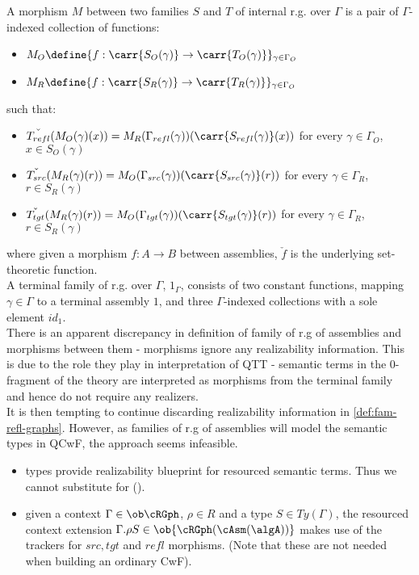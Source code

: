 \documentclass[12pt,a4paper]{article}
\def\src{_{src}}\alwaysmath{src}
\def\rfl{_{refl}}\alwaysmath{rfl}
\def\tgt{_{tgt}}\alwaysmath{tgt}
\renewcommand{\O}{_{O}}\alwaysmath{O}
\def\R{_{R}}\alwaysmath{R}
\begin{document}
A morphism $M$ between two families $S$ and $T$ of internal r.g. over $\Gamma$ is a pair of $\Gamma$-indexed collection of functions:
\begin{itemize}[noitemsep]
  \item $M\O \define \{f : \carr{S\O(\gamma)} \to \carr{T\O(\gamma)} \}_{\gamma \in \Gamma\O}$
  \item $M\R \define \{f : \carr{S\R(\gamma)} \to \carr{T\R(\gamma)} \}_{\gamma \in \Gamma\O}$
\end{itemize}
such that:
\begin{itemize}[noitemsep]
  \item $\check{T\rfl}(M\O (\gamma)(x)) = M\R(\Gamma\rfl(\gamma))(\carr{S\rfl(\gamma)}(x))$ for every $\gamma \in \Gamma\O$, $x \in S\O(\gamma)$
  \item $\check{T\src}(M\R (\gamma)(r)) = M\O(\Gamma\src(\gamma))(\carr{S\src(\gamma)}(r))$ for every $\gamma \in \Gamma\R$, $r \in S\R(\gamma)$
  \item $\check{T\tgt}(M\R (\gamma)(r)) = M\O(\Gamma\tgt(\gamma))(\carr{S\tgt(\gamma)}(r))$ for every $\gamma \in \Gamma\R$, $r \in S\R(\gamma)$
  
\end{itemize}
where given a morphism $f : A \to B$ between assemblies, $\check f$ is the underlying set-theoretic function.\\
A terminal family of r.g. over $\Gamma$, $1_\Gamma$,  consists of two constant functions, mapping $\gamma\in\Gamma$ to a terminal assembly $1$, and three $\Gamma$-indexed collections with a sole element $id_1$.\\

There is an apparent discrepancy in definition of family of r.g of assemblies and morphisms between them - morphisms ignore any realizability information. This is due to the role they  play in interpretation of QTT - semantic terms in the $0$-fragment of the theory are interpreted as morphisms from the terminal family and hence do not require any realizers.\\
It is then tempting to continue discarding realizability information in \cref{def:fam-refl-graphs}. However, as families of r.g of assemblies will model the semantic types in QCwF, the approach seems infeasible.
\begin{itemize}[noitemsep]
  \item types provide realizability blueprint for resourced semantic terms. Thus we cannot substitute \cSet for \cAsm(\algA).
  \item given a context $\Gamma \in \ob\cRGph$, $\rho \in R$ and a type $S \in Ty(\Gamma)$, the resourced context extension $\Gamma.\rho S \in \ob{\cRGph(\cAsm(\algA))}$ makes use of the trackers for $src, tgt$ and $refl$ morphisms. (Note that these are not needed when building an ordinary CwF).
\end{itemize}
\end{document}
